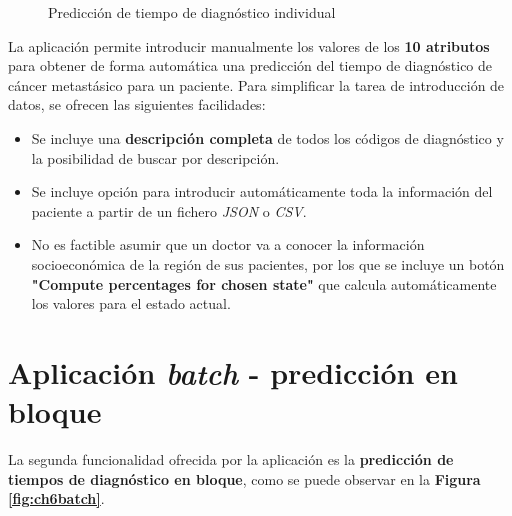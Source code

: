 \begin{figure}[h]
	\vspace{-3mm}
	\centering
	\captionsetup{belowskip=-25pt, justification=centering}
	\caption{Predicción de tiempo de diagnóstico individual}
	\label{fig:ch6single}
\end{figure}

La aplicación permite introducir manualmente los valores de los \textbf{10 atributos} para obtener de forma automática una predicción del tiempo de diagnóstico de cáncer metastásico para un paciente. Para simplificar la tarea de introducción de datos, se ofrecen las siguientes facilidades:

\begin{itemize}[parsep=1pt, itemsep=1pt, topsep=2pt]
	\item Se incluye una \textbf{descripción completa} de todos los códigos de diagnóstico y la posibilidad de buscar por descripción.
	\item Se incluye opción para introducir automáticamente toda la información del paciente a partir de un fichero \textit{JSON} o \textit{CSV}.
	\item No es factible asumir que un doctor va a conocer la información socioeconómica de la región de sus pacientes, por los que se incluye un botón \textbf{"Compute percentages for chosen state"} que calcula automáticamente los valores para el estado actual.
\end{itemize}

\vspace*{-6mm}
\section{Aplicación \textit{batch} - predicción en bloque}

La segunda funcionalidad ofrecida por la aplicación es la \textbf{predicción de tiempos de diagnóstico en bloque}, como se puede observar en la \textbf{Figura \ref{fig:ch6batch}}.

